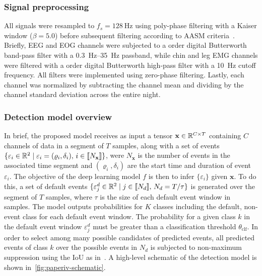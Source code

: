 \subsubsection{Signal preprocessing}
All signals were resampled to \(f_s = \SI{128}{\hertz}\) using poly-phase filtering
with a Kaiser window ($\beta = \num{5.0}$) before subsequent filtering according to \ac{AASM} criteria~\cite{Berry2020}.
Briefly, \ac{EEG} and \ac{EOG} channels were subjected to a  order digital Butterworth band-pass filter with a \SIrange{0.3}{35}{\hertz} passband, while chin and leg \ac{EMG} channels were filtered with a  order digital Butterworth high-pass filter with a \SI{10}{\hertz} cutoff frequency.
All filters were implemented using zero-phase filtering.
Lastly, each channel was normalized by subtracting the channel mean and dividing by the channel standard deviation across the entire night.

\subsubsection{Detection model overview}
In brief, the proposed model receives as input a tensor $\mathbf{x}\in \mathbb{R}^{C \times T}$ containing $C$ channels of data in a segment of $T$ samples, along with a set of events $\lbrace \varepsilon_{i} \in \real{2} \mid \varepsilon_i = \left( \varrho_{i}, \delta_{i} \right),\, i\in \llbracket N_{\mathbf{x}} \rrbracket \rbrace$, were $N_{\mathbf{x}}$ is the number of events in the associated time segment and $\left(\varrho_{i},\delta_{i}\right)$ are the start time and duration of event $\varepsilon_i$.
The objective of the deep learning model $f$ is then to infer $\lbrace \varepsilon_{i} \rbrace$ given $\mathbf{x}$.
To do this, a set of default events $\lbrace \varepsilon_{j}^{d} \in \mathbb{R}^{2} \mid j\in\llbracket N_{d} \rrbracket,\, N_{d} = T/\tau \rbrace$ is generated over the segment of $T$ samples, where $\tau$ is the size of each default event window in samples.
The model outputs probabilities for $K$ classes including the default, non-event class for each default event window.
The probability for a given class $k$ in the default event window $\varepsilon_j^d$ must be greater than a classification threshold $\theta_{\mathrm{clf}}$.
In order to select among many possible candidates of predicted events, all predicted events of class $k$ over the possible events in $N_d$ is subjected to non-maximum suppression using the \ac{IoU} as in~\cite{Redmon2016a,Redmon2016b}.
A high-level schematic of the detection model is shown in~\cref{fig:paperiv-schematic}.

